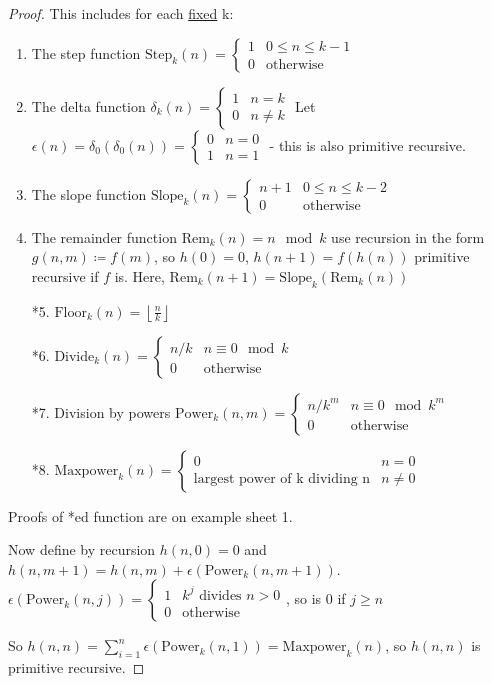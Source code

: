 \documentclass[10pt,a4paper]{article}
\begin{document}
\begin{proof}
This includes for each \underline{fixed} k:
\begin{enumerate}
\item The step function $\text{Step}_k(n) = \begin{cases} 1 & 0\leq n\leq k-1 \\ 0 & \text{otherwise} \end{cases}$
\item The delta function $\delta_k(n) = \begin{cases} 1 & n=k \\ 0 & n\neq k\end{cases}$ Let $\epsilon(n) = \delta_0(\delta_0(n)) = \begin{cases} 0 & n=0\\ 1 & n=1\end{cases}$ - this is also primitive recursive.
\item The slope function $\text{Slope}_k(n) = \begin{cases} n+1 & 0\leq n \leq k-2 \\ 0 & \text{otherwise} \end{cases}$
\item The remainder function $\text{Rem}_k(n) = n \mod k$ use recursion in the form $g(n,m) \coloneqq f(m)$, so $h(0) = 0$, $h(n+1)=f(h(n))$ primitive recursive if $f$ is. Here, $\text{Rem}_k(n+1) = \text{Slope}_k(\text{Rem}_k(n))$
\item[*5.] $\text{Floor}_k(n) = \left\lfloor\frac{n}{k}\right\rfloor$
\item[*6.] $\text{Divide}_k(n) = \begin{cases} n/k & n\equiv 0 \mod k \\ 0 & \text{otherwise} \end{cases}$
\item[*7.] Division by powers $\text{Power}_k(n,m) = \begin{cases} n/k^m & n\equiv 0 \mod k^m \\ 0 & \text{otherwise} \end{cases}$
\item[*8.] $\text{Maxpower}_k(n) = \begin{cases} 0 & n=0 \\ \text{largest power of k dividing n} & n\neq 0 \end{cases}$
\end{enumerate}
Proofs of *ed function are on example sheet 1.

Now define by recursion $h(n,0) = 0$ and $h(n,m+1) = h(n,m) + \epsilon(\text{Power}_k(n,m+1))$.\\
$\epsilon(\text{Power}_k(n,j)) = \begin{cases} 1 & k^j \text{ divides } n>0 \\ 0 & \text{otherwise} \end{cases}$, so is $0$ if $j\geq n$

So $h(n,n) = \sum_{i=1}^n \epsilon(\text{Power}_k(n,1)) = \text{Maxpower}_k(n)$, so $h(n,n)$ is primitive recursive.
\end{proof}
\end{document}
